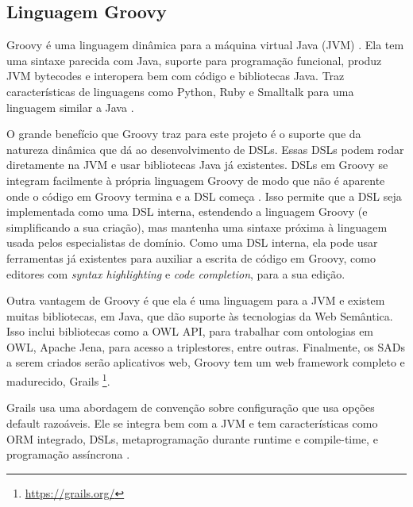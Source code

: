 \subsection*{Linguagem \foreignlanguage{english}{Groovy}}

%
Groovy\foreignlanguage{brazil}{ é uma linguagem dinâmica para a máquina
virtual Java (}JVM\foreignlanguage{brazil}{) \citep{koenig2007groovy}.
Ela tem uma sintaxe parecida com Java, suporte para programação funcional,
produz }JVM bytecodes\foreignlanguage{brazil}{ e interopera bem com
código e bibliotecas Java. Traz características de linguagens como
}Python\foreignlanguage{brazil}{, }Ruby\foreignlanguage{brazil}{ e
}Smalltalk\foreignlanguage{brazil}{ para uma linguagem similar a Java
\citep{koenig2007groovy}.}

%
O grande benefício que \foreignlanguage{english}{Groovy} traz para
este projeto é o suporte que da natureza dinâmica que dá ao desenvolvimento
de DSLs. Essas DSLs podem rodar diretamente na \foreignlanguage{english}{JVM}
e usar bibliotecas Java já existentes. DSLs em \foreignlanguage{english}{Groovy}
se integram facilmente à própria linguagem Groovy de modo que não
é aparente onde o código em \foreignlanguage{english}{Groovy} termina
e a DSL começa \citep{dearle2015groovy}. Isso permite que a DSL
seja implementada como uma DSL interna, estendendo a linguagem Groovy
(e simplificando a sua criação), mas mantenha uma sintaxe próxima
à linguagem usada pelos especialistas de domínio. Como uma DSL interna,
ela pode usar ferramentas já existentes para auxiliar a escrita de
código em Groovy, como editores com \foreignlanguage{english}{\textit{syntax
highlighting}} e \foreignlanguage{english}{\textit{code completion}},
para a sua edição.

Outra vantagem de Groovy é que ela é uma linguagem para a \foreignlanguage{english}{JVM}
e existem muitas bibliotecas, em Java, que dão suporte às tecnologias
da Web Semântica. Isso inclui bibliotecas como a \foreignlanguage{english}{OWL
API}, para trabalhar com ontologias em \foreignlanguage{english}{OWL},
Apache \foreignlanguage{english}{Jena}, para acesso a \foreignlanguage{english}{triplestores},
entre outras. Finalmente, os SADs a serem criados serão aplicativos
web, Groovy tem um web framework completo e madurecido, Grails\foreignlanguage{english}{
}\footnote{%
\url{https://grails.org/}%
}. 

Grails usa uma abordagem de convenção sobre configuração que usa opções
default razoáveis. Ele se integra bem com a JVM e tem características
como ORM integrado, DSLs, metaprogramação durante runtime e compile-time,
e programação assíncrona \citep{smith2009grails}.


